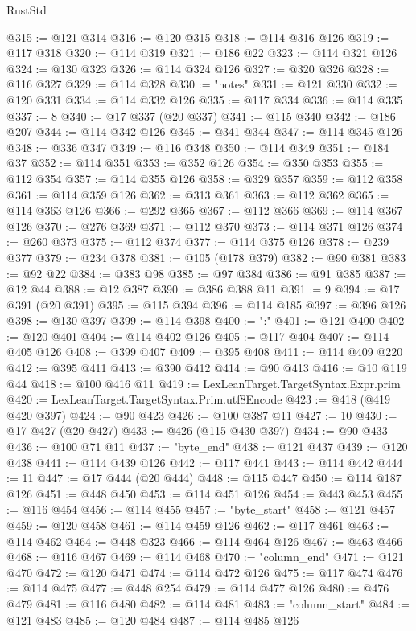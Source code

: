 \begin{lexlean}{RustStd}
\begin{coremodule}
@315 := @121 @314
@316 := @120 @315
@318 := @114 @316 @126
@319 := @117 @318
@320 := @114 @319
@321 := @186 @22
@323 := @114 @321 @126
@324 := @130 @323
@326 := @114 @324 @126
@327 := @320 @326
@328 := @116 @327
@329 := @114 @328
@330 := "notes"
@331 := @121 @330
@332 := @120 @331
@334 := @114 @332 @126
@335 := @117 @334
@336 := @114 @335
@337 := 8
@340 := @17 @337 (@20 @337)
@341 := @115 @340
@342 := @186 @207
@344 := @114 @342 @126
@345 := @341 @344
@347 := @114 @345 @126
@348 := @336 @347
@349 := @116 @348
@350 := @114 @349
@351 := @184 @37
@352 := @114 @351
@353 := @352 @126
@354 := @350 @353
@355 := @112 @354
@357 := @114 @355 @126
@358 := @329 @357
@359 := @112 @358
@361 := @114 @359 @126
@362 := @313 @361
@363 := @112 @362
@365 := @114 @363 @126
@366 := @292 @365
@367 := @112 @366
@369 := @114 @367 @126
@370 := @276 @369
@371 := @112 @370
@373 := @114 @371 @126
@374 := @260 @373
@375 := @112 @374
@377 := @114 @375 @126
@378 := @239 @377
@379 := @234 @378
@381 := @105 (@178 @379)
@382 := @90 @381
@383 := @92 @22
@384 := @383 @98
@385 := @97 @384
@386 := @91 @385
@387 := @12 @44
@388 := @12 @387
@390 := @386 @388 @11
@391 := 9
@394 := @17 @391 (@20 @391)
@395 := @115 @394
@396 := @114 @185
@397 := @396 @126
@398 := @130 @397
@399 := @114 @398
@400 := ":"
@401 := @121 @400
@402 := @120 @401
@404 := @114 @402 @126
@405 := @117 @404
@407 := @114 @405 @126
@408 := @399 @407
@409 := @395 @408
@411 := @114 @409 @220
@412 := @395 @411
@413 := @390 @412
@414 := @90 @413
@416 := @10 @119 @44
@418 := @100 @416 @11
@419 := LexLeanTarget.TargetSyntax.Expr.prim
@420 := LexLeanTarget.TargetSyntax.Prim.utf8Encode
@423 := @418 (@419 @420 @397)
@424 := @90 @423
@426 := @100 @387 @11
@427 := 10
@430 := @17 @427 (@20 @427)
@433 := @426 (@115 @430 @397)
@434 := @90 @433
@436 := @100 @71 @11
@437 := "byte_end"
@438 := @121 @437
@439 := @120 @438
@441 := @114 @439 @126
@442 := @117 @441
@443 := @114 @442
@444 := 11
@447 := @17 @444 (@20 @444)
@448 := @115 @447
@450 := @114 @187 @126
@451 := @448 @450
@453 := @114 @451 @126
@454 := @443 @453
@455 := @116 @454
@456 := @114 @455
@457 := "byte_start"
@458 := @121 @457
@459 := @120 @458
@461 := @114 @459 @126
@462 := @117 @461
@463 := @114 @462
@464 := @448 @323
@466 := @114 @464 @126
@467 := @463 @466
@468 := @116 @467
@469 := @114 @468
@470 := "column_end"
@471 := @121 @470
@472 := @120 @471
@474 := @114 @472 @126
@475 := @117 @474
@476 := @114 @475
@477 := @448 @254
@479 := @114 @477 @126
@480 := @476 @479
@481 := @116 @480
@482 := @114 @481
@483 := "column_start"
@484 := @121 @483
@485 := @120 @484
@487 := @114 @485 @126

\end{coremodule}
\end{lexlean}
